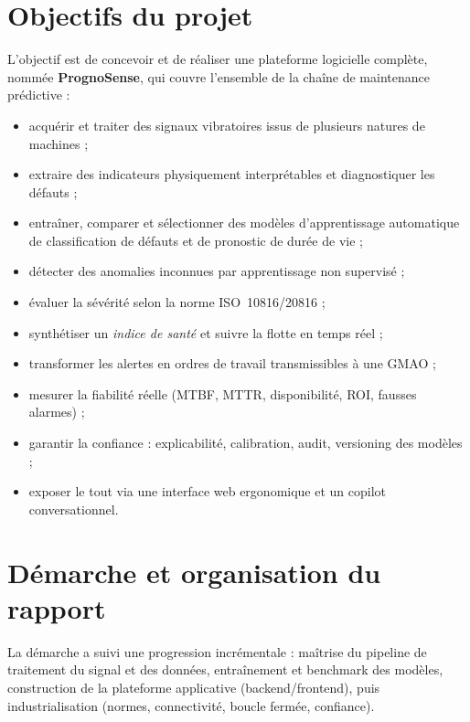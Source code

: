 \section{Objectifs du projet}
L'objectif est de concevoir et de réaliser une plateforme logicielle complète, nommée
\textbf{PrognoSense}, qui couvre l'ensemble de la chaîne de maintenance prédictive :
\begin{itemize}[leftmargin=1.5em]
  \item acquérir et traiter des signaux vibratoires issus de plusieurs natures de machines ;
  \item extraire des indicateurs physiquement interprétables et diagnostiquer les défauts ;
  \item entraîner, comparer et sélectionner des modèles d'apprentissage automatique de
        classification de défauts et de pronostic de durée de vie ;
  \item détecter des anomalies inconnues par apprentissage non supervisé ;
  \item évaluer la sévérité selon la norme ISO~10816/20816 ;
  \item synthétiser un \emph{indice de santé} et suivre la flotte en temps réel ;
  \item transformer les alertes en ordres de travail transmissibles à une GMAO ;
  \item mesurer la fiabilité réelle (MTBF, MTTR, disponibilité, ROI, fausses alarmes) ;
  \item garantir la confiance : explicabilité, calibration, audit, versioning des modèles ;
  \item exposer le tout via une interface web ergonomique et un copilot conversationnel.
\end{itemize}

\section{Démarche et organisation du rapport}
La démarche a suivi une progression incrémentale : maîtrise du pipeline de traitement du
signal et des données, entraînement et benchmark des modèles, construction de la plateforme
applicative (backend/frontend), puis industrialisation (normes, connectivité, boucle
fermée, confiance).

